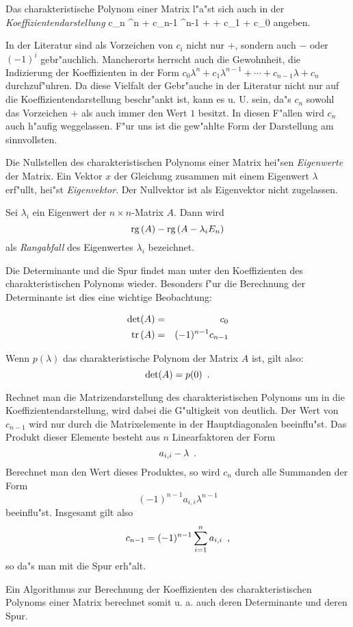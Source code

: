 Das charakteristische Polynom einer Matrix l"a"st sich auch in der
 {\em Koeffizientendarstellung} 
    c_n \lambda^n + c_{n-1} \lambda^{n-1} + \cdots + c_1 \lambda + c_0
\Eeq
angeben.

In der Literatur sind als
Vorzeichen von $c_i$ nicht nur $+$, sondern auch $-$ oder $(-1)^i$
gebr"auchlich. Mancherorts herrscht auch die Gewohnheit,
die Indizierung der Koeffizienten in der Form
$c_0 \lambda^n + c_1 \lambda^{n-1} + \cdots + c_{n-1} \lambda + c_n$
durchzuf"uhren. Da diese Vielfalt der Gebr"auche in der Literatur nicht 
nur auf die Koeffizientendarstellung beschr"ankt ist, kann es u. U. sein, 
da"s $c_n$ sowohl das Vorzeichen $+$ als auch immer den Wert $1$ besitzt.
In diesen F"allen wird $c_n$ auch h"aufig weggelassen.
F"ur uns ist die gew"ahlte Form  der Darstellung
am sinnvollsten.

\MyBeginDef 
\label{DefEigenwert}
 
    Die Nullstellen des charakteristischen Polynoms einer Matrix hei"sen
    {\em Eigenwerte} der Matrix. Ein Vektor $x$ der
    Gleichung  zusammen mit einem Eigenwert
    $\lambda$ erf"ullt, hei"st {\em Eigenvektor}. Der Nullvektor ist
    als Eigenvektor nicht zugelassen.
\MyEndDef

\MyBeginDef
    Sei $\lambda_i$ ein Eigenwert der $n \times n$-Matrix $A$. Dann wird
    \[ \mbox{\rm rg} \,(A) - \mbox{\rm rg} \,(A - \lambda_i E_n) \] als
    {\em Rangabfall}  des Eigenwertes $\lambda_i$ 
    bezeichnet.
\MyEndDef

Die Determinante und die Spur findet man unter den Koeffizienten des
charakteristischen Polynoms wieder. Besonders f"ur die Berechnung der
Determinante ist dies eine wichtige Beobachtung:
\begin{bemerkung}
\label{SatzDdurchP}
    \begin{eqnarray}
       \det(A) & = & c_0               \nonumber
    \\ \mbox{\rm tr} \,(A) & = & (-1)^{n-1} c_{n-1} \label{EquTrCoefficient}
    \end{eqnarray}
\end{bemerkung}
Wenn $p(\lambda)$ das charakteristische Polynom der Matrix $A$ ist, gilt
also: \[ \det(A)= p(0) \mbox{\hspace{0.5em}.} \]

Rechnet man die Matrizendarstellung des charakteristischen Polynoms um in
die Koeffizientendarstellung, wird dabei die G"ultigkeit von
 deutlich. Der Wert von $c_{n-1}$ wird nur durch
die Matrixelemente in der Hauptdiagonalen beeinflu"st. Das Produkt dieser
Elemente besteht aus $n$ Linearfaktoren der Form
\[ a_{i,i} - \lambda \mbox{\hspace{0.5em}.} \] Berechnet man den Wert dieses Produktes,
so wird $c_n$ durch alle Summanden der Form
\[ (-1)^{n-1} a_{i,i}\lambda^{n-1} \] beeinflu"st. Insgesamt gilt also
\[ c_{n-1} = (-1)^{n-1} \sum_{i=1}^n a_{i,i} \mbox{\hspace{0.5em},} \] so da"s man mit
 die Spur erh"alt.

Ein Algorithmus zur Berechnung der Koeffizienten des charakteristischen
Polynoms einer Matrix berechnet somit u. a. auch deren Determinante und
deren Spur.


